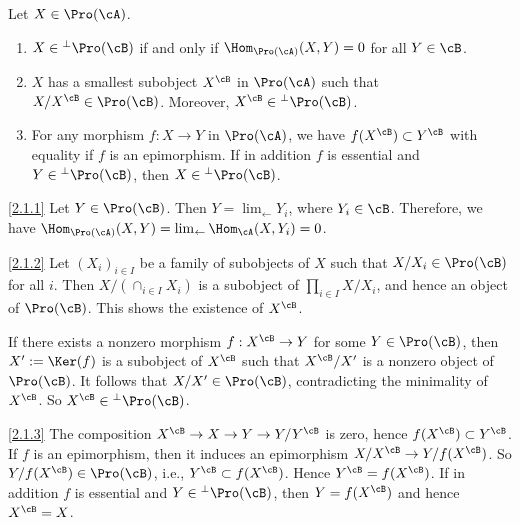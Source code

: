 \begin{lemm}\label{lem:perp}
Let $X \in \Pro(\cA)$.
\begin{enumerate}\romanenumi
\item \label{2.1.1} $X \in {^{\perp}\Pro(\cB)}$ if and only if $\Hom_{\Pro(\cA)}(X,Y) = 0$ for all $Y \in \cB$.

\item \label{2.1.2} $X$ has a smallest subobject $X^{\cB}$ in $\Pro(\cA)$ such that $X/X^{\cB} \in \Pro(\cB)$. Moreover, $X^{\cB} \in {^{\perp}\Pro(\cB)}$.

\item \label{2.1.3} For any morphism $f : X \to Y$ in $\Pro(\cA)$, we have $f(X^{\cB}) \subset Y^{\cB}$ with equality if $f$ is an epimorphism. If in addition $f$ is essential and $Y \in {^{\perp}\Pro(\cB)}$, then $X \in {^{\perp}\Pro(\cB)}$.
\end{enumerate}
\end{lemm}

\begin{proofc}
\begin{step}{\eqref{2.1.1}}%
Let $Y \in \Pro(\cB)$. Then $Y = \lim_{\leftarrow} Y_i$, where $Y_i \in \cB$. Therefore, we have $\Hom_{\Pro(\cA)}(X,Y) = \lim_{\leftarrow} \Hom_{\cA}(X,Y_i) = 0$.
\end{step}

\begin{step}{\eqref{2.1.2}}%
Let $(X_i)_{i \in I}$ be a family of subobjects of $X$ such that $X/X_i \in \Pro(\cB)$ for all $i$. Then $X/(\cap_{i \in I} X_i)$ is a subobject of $\prod_{i \in I} X/X_i$, and hence an object of $\Pro(\cB)$. This shows the existence of $X^{\cB}$.

If there exists a nonzero morphism $f : X ^{\cB} \to Y$ for some $Y \in \Pro(\cB)$, then $X' := \Ker(f)$ is a subobject of $X^{\cB}$ such that $X^{\cB} /X'$ is a nonzero object of $\Pro(\cB)$. It follows that $X/X' \in \Pro(\cB)$, contradicting the minimality of $X^{\cB}$. So $X^{\cB} \in {^{\perp}\Pro(\cB)}$.
\end{step}

\begin{laststep}{\eqref{2.1.3}}%
The composition $X^{\cB} \to X \to Y \to Y/Y^{\cB}$ is zero, hence $f(X^{\cB}) \subset Y^{\cB}$. If $f$ is an epimorphism, then it induces an epimorphism $X/X^{\cB} \to Y/f(X^{\cB})$. So $Y/f(X^{\cB}) \in \Pro(\cB)$, i.e., $Y^{\cB} \subset f(X^{\cB})$. Hence $Y^{\cB} = f(X^{\cB})$. If in addition $f$ is essential and $Y \in {^{\perp}\Pro(\cB)}$, then $Y = f(X^{\cB})$ and hence $X^{\cB} = X$.
\end{laststep}
\let\qed\relax
\end{proofc}

